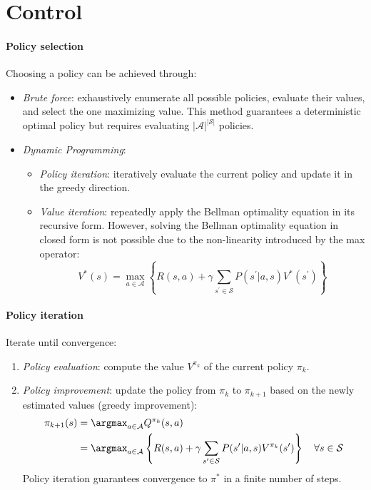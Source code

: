 \section{Control}

\paragraph*{Policy selection}
Choosing a policy can be achieved through:
\begin{itemize}
    \item \textit{Brute force}: exhaustively enumerate all possible policies, evaluate their values, and select the one maximizing value. 
        This method guarantees a deterministic optimal policy but requires evaluating  $\left\lvert\mathcal{A}\right\rvert^{\left\lvert\mathcal{S}\right\rvert}$ policies.
    \item \textit{Dynamic Programming}:
        \begin{itemize}
            \item \textit{Policy iteration}: iteratively evaluate the current policy and update it in the greedy direction.
            \item \textit{Value iteration}: repeatedly apply the Bellman optimality equation in its recursive form. 
                However, solving the Bellman optimality equation in closed form is not possible due to the non-linearity introduced by the max operator:
            \[V^\ast(s)=\max_{a\in\mathcal{A}}\left\{R(s,a)+\gamma\sum_{s^\prime\in\mathcal{S}}P(s^\prime|a,s)V^\ast(s^\prime)\right\}\]
        \end{itemize}
\end{itemize}

\paragraph*{Policy iteration}
Iterate until convergence:
\begin{enumerate}
    \item \textit{Policy evaluation}: compute the value $V^{\pi_k}$ of the current policy $\pi_k$.
    \item \textit{Policy improvement}: update the policy from $\pi_k$ to $\pi_{k+1}$ based on the newly estimated values (greedy improvement):
        \begin{align*}
            \pi_{k+1}(s)    &= \argmax_{a\in\mathcal{A}}Q^{\pi_k}(s,a) \\
                            &= \argmax_{a\in\mathcal{A}}\left\{R(s,a)+\gamma\sum_{s^\prime\in\mathcal{S}}P(s^\prime|a, s)V^{\pi_k}(s^\prime)\right\}\quad\forall s \in \mathcal{S}
        \end{align*}
        Policy iteration guarantees convergence to $\pi^\ast$ in a finite number of steps.
\end{enumerate}

